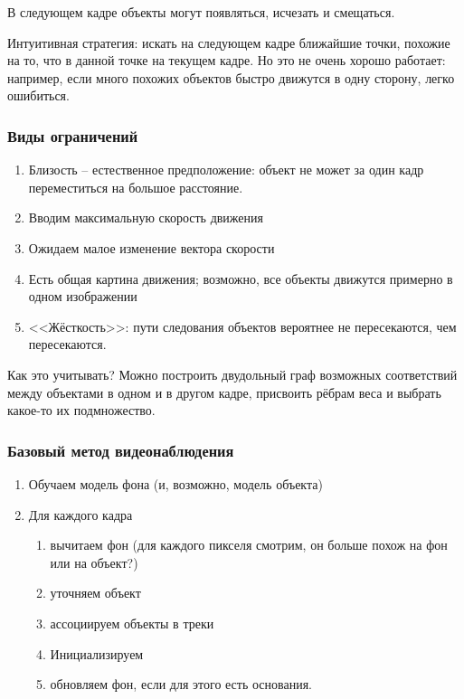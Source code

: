 \documentclass[main.tex]{subfiles}
\begin{document}
В следующем кадре объекты могут появляться, исчезать и смещаться.

Интуитивная стратегия: искать на следующем кадре ближайшие точки, похожие на то, что в данной точке на текущем кадре.
Но это не очень хорошо работает: например, если много похожих объектов быстро движутся в одну сторону, легко ошибиться.

\subsubsection{Виды ограничений}

\begin{enumerate}[noitemsep]
	\item Близость -- естественное предположение: объект не может за один кадр переместиться на большое расстояние.
	
	\item Вводим максимальную скорость движения
	
	\item Ожидаем малое изменение вектора скорости
	
	\item Есть общая картина движения; возможно, все объекты движутся примерно в одном изображении
	
	\item <<Жёсткость>>: пути следования объектов вероятнее не пересекаются, чем пересекаются.
\end{enumerate}

Как это учитывать?
Можно построить двудольный граф возможных соответствий между объектами в одном и в другом кадре, присвоить рёбрам веса и выбрать какое-то их подмножество.

\subsubsection{Базовый метод видеонаблюдения}

\begin{enumerate}[noitemsep]
	\item Обучаем модель фона (и, возможно, модель объекта)
	\item Для каждого кадра
	\begin{enumerate}[noitemsep]
		\item вычитаем фон (для каждого пикселя смотрим, он больше похож на фон или на объект?)
		\item уточняем объект
		\item ассоциируем объекты в треки
		\item Инициализируем
		\item обновляем фон, если для этого есть основания.
	\end{enumerate}
\end{enumerate}
\end{document}
